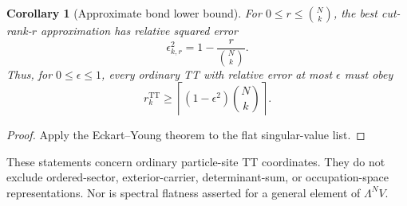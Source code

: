 \documentclass{article}
\newtheorem{corollary}{Corollary}
\newcommand{\TT}{\mathrm{TT}}
\begin{document}
\begin{corollary}[Approximate bond lower bound]
For $0\le r\le \binom{N}{k}$, the best cut-rank-$r$ approximation has relative
squared error
\[
 \epsilon_{k,r}^2=1-\frac{r}{\binom{N}{k}}.
\]
Thus, for $0\le\epsilon\le1$, every ordinary TT with relative error at most
$\epsilon$ must obey
\[
 r_k^{\TT}\ge\left\lceil(1-\epsilon^2)\binom{N}{k}\right\rceil.
\]
\end{corollary}
\begin{proof}
Apply the Eckart--Young theorem to the flat singular-value list.
\end{proof}

These statements concern ordinary particle-site TT coordinates. They do not
exclude ordered-sector, exterior-carrier, determinant-sum, or occupation-space
representations. Nor is spectral flatness asserted for a general element of
$\Lambda^N V$.
\end{document}
